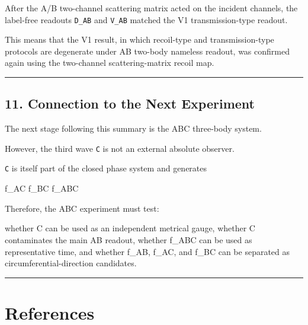 \documentclass[
]{article}
\newenvironment{Shaded}{}{}
\newcommand{\NormalTok}[1]{#1}
\begin{document}
After the A/B two-channel scattering matrix acted on the incident
channels, the label-free readouts \texttt{D\_AB} and \texttt{V\_AB}
matched the V1 transmission-type readout.

This means that the V1 result, in which recoil-type and
transmission-type protocols are degenerate under AB two-body nameless
readout, was confirmed again using the two-channel scattering-matrix
recoil map.

\begin{center}\rule{0.5\linewidth}{0.5pt}\end{center}

\subsection{11. Connection to the Next
Experiment}\label{connection-to-the-next-experiment}

The next stage following this summary is the ABC three-body system.

However, the third wave \texttt{C} is not an external absolute observer.

\texttt{C} is itself part of the closed phase system and generates

\begin{Shaded}
\begin{Highlighting}[]
\NormalTok{f\_AC}
\NormalTok{f\_BC}
\NormalTok{f\_ABC}
\end{Highlighting}
\end{Shaded}

Therefore, the ABC experiment must test:

\begin{Shaded}
\begin{Highlighting}[]
\NormalTok{whether C can be used as an independent metrical gauge,}
\NormalTok{whether C contaminates the main AB readout,}
\NormalTok{whether f\_ABC can be used as representative time,}
\NormalTok{and whether f\_AB, f\_AC, and f\_BC can be separated as circumferential{-}direction candidates.}
\end{Highlighting}
\end{Shaded}

\begin{center}\rule{0.5\linewidth}{0.5pt}\end{center}

\section{References}\label{references}
\end{document}
